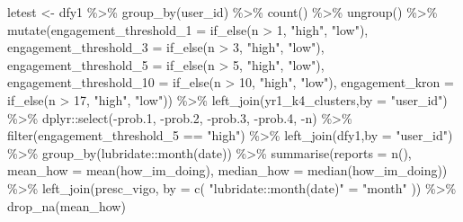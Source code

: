 \documentclass[
]{article}
\newenvironment{Shaded}{\begin{snugshade}}{\end{snugshade}}
\newcommand{\AttributeTok}[1]{\textcolor[rgb]{0.77,0.63,0.00}{#1}}
\newcommand{\DecValTok}[1]{\textcolor[rgb]{0.00,0.00,0.81}{#1}}
\newcommand{\FloatTok}[1]{\textcolor[rgb]{0.00,0.00,0.81}{#1}}
\newcommand{\FunctionTok}[1]{\textcolor[rgb]{0.00,0.00,0.00}{#1}}
\newcommand{\NormalTok}[1]{#1}
\newcommand{\OtherTok}[1]{\textcolor[rgb]{0.56,0.35,0.01}{#1}}
\newcommand{\SpecialCharTok}[1]{\textcolor[rgb]{0.00,0.00,0.00}{#1}}
\newcommand{\StringTok}[1]{\textcolor[rgb]{0.31,0.60,0.02}{#1}}
\begin{document}
\begin{Shaded}
\begin{Highlighting}[]
\NormalTok{ letest }\OtherTok{\textless{}{-}}\NormalTok{  dfy1 }\SpecialCharTok{\%\textgreater{}\%}
   \FunctionTok{group\_by}\NormalTok{(user\_id) }\SpecialCharTok{\%\textgreater{}\%}
   \FunctionTok{count}\NormalTok{() }\SpecialCharTok{\%\textgreater{}\%}
   \FunctionTok{ungroup}\NormalTok{() }\SpecialCharTok{\%\textgreater{}\%} 
   \FunctionTok{mutate}\NormalTok{(}\AttributeTok{engagement\_threshold\_1 =} \FunctionTok{if\_else}\NormalTok{(n }\SpecialCharTok{\textgreater{}} \DecValTok{1}\NormalTok{, }\StringTok{"high"}\NormalTok{, }\StringTok{"low"}\NormalTok{),}
          \AttributeTok{engagement\_threshold\_3 =} \FunctionTok{if\_else}\NormalTok{(n }\SpecialCharTok{\textgreater{}} \DecValTok{3}\NormalTok{, }\StringTok{"high"}\NormalTok{, }\StringTok{"low"}\NormalTok{),}
          \AttributeTok{engagement\_threshold\_5 =} \FunctionTok{if\_else}\NormalTok{(n }\SpecialCharTok{\textgreater{}} \DecValTok{5}\NormalTok{, }\StringTok{"high"}\NormalTok{, }\StringTok{"low"}\NormalTok{),}
          \AttributeTok{engagement\_threshold\_10 =} \FunctionTok{if\_else}\NormalTok{(n }\SpecialCharTok{\textgreater{}} \DecValTok{10}\NormalTok{, }\StringTok{"high"}\NormalTok{, }\StringTok{"low"}\NormalTok{),}
          \AttributeTok{engagement\_kron =} \FunctionTok{if\_else}\NormalTok{(n }\SpecialCharTok{\textgreater{}} \DecValTok{17}\NormalTok{, }\StringTok{"high"}\NormalTok{, }\StringTok{"low"}\NormalTok{)) }\SpecialCharTok{\%\textgreater{}\%} 
   \FunctionTok{left\_join}\NormalTok{(yr1\_k4\_clusters,}\AttributeTok{by =} \StringTok{"user\_id"}\NormalTok{) }\SpecialCharTok{\%\textgreater{}\%} 
\NormalTok{   dplyr}\SpecialCharTok{::}\FunctionTok{select}\NormalTok{(}\SpecialCharTok{{-}}\NormalTok{prob}\FloatTok{.1}\NormalTok{,}
                 \SpecialCharTok{{-}}\NormalTok{prob}\FloatTok{.2}\NormalTok{,}
                 \SpecialCharTok{{-}}\NormalTok{prob}\FloatTok{.3}\NormalTok{,}
                 \SpecialCharTok{{-}}\NormalTok{prob}\FloatTok{.4}\NormalTok{,}
                 \SpecialCharTok{{-}}\NormalTok{n) }\SpecialCharTok{\%\textgreater{}\%} 
  \FunctionTok{filter}\NormalTok{(engagement\_threshold\_5 }\SpecialCharTok{==} \StringTok{"high"}\NormalTok{) }\SpecialCharTok{\%\textgreater{}\%}
   \FunctionTok{left\_join}\NormalTok{(dfy1,}\AttributeTok{by =} \StringTok{"user\_id"}\NormalTok{) }\SpecialCharTok{\%\textgreater{}\%}  
   \FunctionTok{group\_by}\NormalTok{(lubridate}\SpecialCharTok{::}\FunctionTok{month}\NormalTok{(date)) }\SpecialCharTok{\%\textgreater{}\%}
   \FunctionTok{summarise}\NormalTok{(}\AttributeTok{reports =} \FunctionTok{n}\NormalTok{(),}
             \AttributeTok{mean\_how =} \FunctionTok{mean}\NormalTok{(how\_im\_doing),}
             \AttributeTok{median\_how =} \FunctionTok{median}\NormalTok{(how\_im\_doing)) }\SpecialCharTok{\%\textgreater{}\%}
   \FunctionTok{left\_join}\NormalTok{(presc\_vigo, }\AttributeTok{by =} \FunctionTok{c}\NormalTok{( }\StringTok{"lubridate::month(date)"} \OtherTok{=} \StringTok{"month"}\NormalTok{ )) }\SpecialCharTok{\%\textgreater{}\%} 
   \FunctionTok{drop\_na}\NormalTok{(mean\_how) }




\end{Highlighting}
\end{Shaded}
\end{document}
